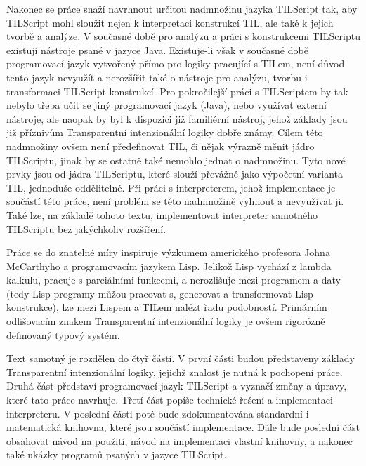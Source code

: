 Nakonec se práce snaží navrhnout určitou nadmnožinu jazyka TILScript tak, aby TILScript mohl
sloužit nejen k interpretaci konstrukcí TIL, ale také k jejich tvorbě a analýze. V současné době
pro analýzu a práci s konstrukcemi TILScriptu existují nástroje psané v jazyce Java. Existuje-li
však v současné době programovací jazyk vytvořený přímo pro logiky pracující s TILem, není důvod
tento jazyk nevyužít a nerozšířit také o nástroje pro analýzu, tvorbu i transformaci TILScript
konstrukcí. Pro pokročilejší práci s TILScriptem by tak nebylo třeba učit se jiný programovací
jazyk (Java), nebo využívat externí nástroje, ale naopak by byl k dispozici již familiérní nástroj,
jehož základy jsou již příznivům Transparentní intenzionální logiky dobře známy. Cílem této
nadmnožiny ovšem není předefinovat TIL, či nějak výrazně měnit jádro TILScriptu, jinak by se
ostatně také nemohlo jednat o nadmnožinu. Tyto nové prvky jsou od jádra TILScriptu, které slouží
převážně jako výpočetní varianta TIL, jednoduše oddělitelné. Při práci s interpreterem, jehož
implementace je součástí této práce, není problém se této nadmnožině vyhnout a nevyužívat ji.
Také lze, na základě tohoto textu, implementovat interpreter samotného TILScriptu bez jakýchkoliv
rozšíření.

Práce se do znatelné míry inspiruje výzkumem amerického profesora Johna McCarthyho a programovacím
jazykem Lisp. Jelikož Lisp vychází z lambda kalkulu, pracuje s parciálními funkcemi, a nerozlišuje
mezi programem a daty (tedy Lisp programy můžou pracovat s, generovat a transformovat Lisp
konstrukce), lze mezi Lispem a TILem nalézt řadu podobností. Primárním odlišovacím znakem
Transparentní intenzionální logiky je ovšem rigorózně definovaný typový systém.

Text samotný je rozdělen do čtyř částí. V první části budou představeny základy Transparentní
intenzionální logiky, jejichž znalost je nutná k pochopení práce. Druhá část představí programovací
jazyk TILScript a vyznačí změny a úpravy, které tato práce navrhuje. Třetí část popíše technické
řešení a implementaci interpreteru. V poslední části poté bude zdokumentována standardní i
matematická knihovna, které jsou součástí implementace. Dále bude poslední část obsahovat návod
na použití, návod na implementaci vlastní knihovny, a nakonec také ukázky programů psaných v jazyce
TILScript.

\endinput
